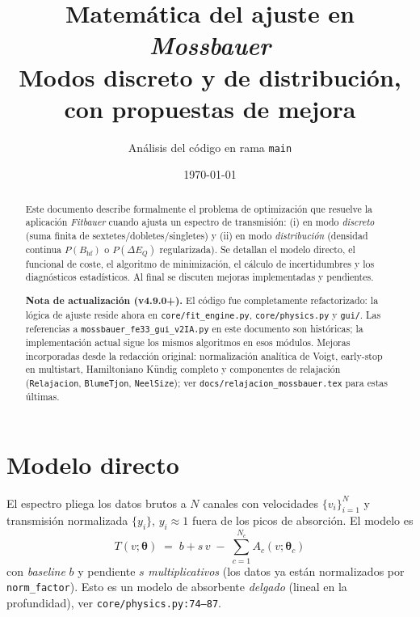 \documentclass[11pt,a4paper]{article}
\title{\textbf{Matemática del ajuste en \emph{Mossbauer}}\\[2pt]
\large Modos discreto y de distribución, con propuestas de mejora}
\author{Análisis del código en rama \texttt{main}}
\date{\today}
\newcommand{\BHF}{B_{\mathrm{hf}}}
\newcommand{\dEQ}{\Delta E_{Q}}
\newcommand{\code}[1]{\texttt{\small #1}}
\newcommand{\file}[1]{\textcolor{black!70}{\texttt{\small #1}}}
\begin{document}
\maketitle

\begin{abstract}\noindent
Este documento describe formalmente el problema de optimización que resuelve la aplicación \emph{Fitbauer} cuando ajusta un espectro de transmisión: (i) en modo \emph{discreto} (suma finita de sextetes/dobletes/singletes) y (ii) en modo \emph{distribución} (densidad continua $P(\BHF)$ o $P(\dEQ)$ regularizada). Se detallan el modelo directo, el funcional de coste, el algoritmo de minimización, el cálculo de incertidumbres y los diagnósticos estadísticos. Al final se discuten mejoras implementadas y pendientes.

\medskip\noindent\textbf{Nota de actualización (v4.9.0+).}
El código fue completamente refactorizado: la lógica de ajuste reside ahora en
\file{core/fit\_engine.py}, \file{core/physics.py} y \file{gui/}. Las referencias
a \file{mossbauer\_fe33\_gui\_v2IA.py} en este documento son históricas; la
implementación actual sigue los mismos algoritmos en esos módulos. Mejoras
incorporadas desde la redacción original: normalización analítica de Voigt,
early-stop en multistart, Hamiltoniano Kündig completo y componentes de relajación
(\code{Relajacion}, \code{BlumeTjon}, \code{NeelSize}); ver
\file{docs/relajacion\_mossbauer.tex} para estas últimas.
\end{abstract}

\tableofcontents
\bigskip

\section{Modelo directo}\label{sec:fwd}

El espectro pliega los datos brutos a $N$ canales con velocidades $\{v_i\}_{i=1}^{N}$ y transmisión normalizada $\{y_i\}$, $y_i \approx 1$ fuera de los picos de absorción. El modelo es
\begin{equation}
  \boxed{\;
  T(v;\bm\theta) \;=\; b + s\,v \;-\; \sum_{c=1}^{N_c} A_c(v;\bm\theta_c)
  \;}
  \label{eq:Tmodel}
\end{equation}
con \emph{baseline} $b$ y pendiente $s$ \emph{multiplicativos} (los datos ya están normalizados por \code{norm\_factor}). Esto es un modelo de absorbente \emph{delgado} (lineal en la profundidad), ver \file{core/physics.py:74--87}.
\end{document}

